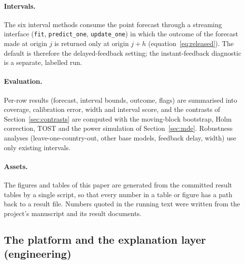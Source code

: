 \paragraph{Intervals.} The six interval methods consume the point forecast through a streaming interface (\texttt{fit}, \texttt{predict\_one}, \texttt{update\_one}) in which the outcome of the forecast made at origin $j$ is returned only at origin $j+h$ (equation~\eqref{eq:released}). The default is therefore the delayed-feedback setting; the instant-feedback diagnostic is a separate, labelled run.

\paragraph{Evaluation.} Per-row results (forecast, interval bounds, outcome, flags) are summarised into coverage, calibration error, width and interval score, and the contrasts of Section~\ref{sec:contrasts} are computed with the moving-block bootstrap, Holm correction, TOST and the power simulation of Section~\ref{sec:mde}. Robustness analyses (leave-one-country-out, other base models, feedback delay, width) use only existing intervals.

\paragraph{Assets.} The figures and tables of this paper are generated from the committed result tables by a single script, so that every number in a table or figure has a path back to a result file. Numbers quoted in the running text were written from the project's manuscript and its result documents.

\subsection{The platform and the explanation layer (engineering)}\label{sec:platform}

